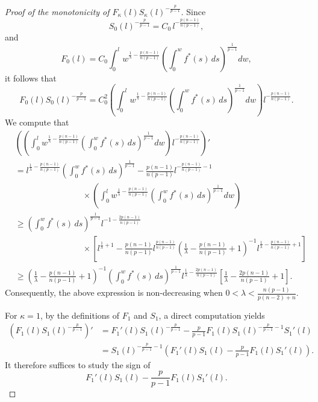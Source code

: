 \documentclass[11pt]{article}
\numberwithin{equation}{section}
\theoremstyle{definition}
\theoremstyle{remark}
\begin{document}
\begin{proof}[Proof of the monotonicity of $F_\kappa(l)S_\kappa(l)^{-\frac{p}{p-1}}$]
Since
\[
S_0(l)^{-\frac{p}{p-1}}
=
C_0\,l^{-\frac{p(n-1)}{n(p-1)}},
\]
and
\[
F_0(l)
=
C_0
\int_0^l
w^{\frac1\lambda-\frac{p(n-1)}{n(p-1)}}
\left(
\int_0^w f^*(s)\,ds
\right)^{\frac1{p-1}}
dw,
\]
it follows that
\[
F_0(l)S_0(l)^{-\frac{p}{p-1}}
=
C_0^2
\left(
\int_0^l
w^{\frac1\lambda-\frac{p(n-1)}{n(p-1)}}
\left(
\int_0^w f^*(s)\,ds
\right)^{\frac1{p-1}}
dw
\right)
l^{-\frac{p(n-1)}{n(p-1)}}.
\]
We compute that
\begin{align*}
&
\left(
\left(
\int_0^l w^{\frac{1}{\lambda}-\frac{p(n-1)}{n(p-1)}}
\left(\int_0^w f^*(s)\,ds\right)^\frac{1}{p-1}dw
\right)
l^{-\frac{p(n-1)}{n(p-1)}}
\right)' \\
&=l^{\frac{1}{\lambda}-\frac{p(n-1)}{n(p-1)}}\left(\int_0^w f^*(s)\,ds\right)^\frac{1}{p-1}
-\frac{p(n-1)}{n(p-1)}l^{-\frac{p(n-1)}{n(p-1)}-1}\\
&\qquad\qquad\qquad\qquad\times\left(
\int_0^l w^{\frac{1}{\lambda}-\frac{p(n-1)}{n(p-1)}}
\left(\int_0^w f^*(s)\,ds\right)^\frac{1}{p-1}dw
\right)\\
&\ge \left(\int_0^w f^*(s)\,ds\right)^\frac{1}{p-1} l^{-1-\frac{2p(n-1)}{n(p-1)}}
\\
&\qquad\qquad\qquad\qquad\times
\left[ l^{\frac{1}{\lambda}+1}- \frac{p(n-1)}{n(p-1)}l^{\frac{p(n-1)}{n(p-1)}}
(\frac{1}{\lambda}-\frac{p(n-1)}{n(p-1)}+1)^{-1}l^{\frac{1}{\lambda}-\frac{p(n-1)}{n(p-1)}+1}
                       \right]\\
&\ge (\frac{1}{\lambda}-\frac{p(n-1)}{n(p-1)}+1)^{-1}\left(\int_0^w f^*(s)\,ds\right)^\frac{1}{p-1} l^{\frac{1}{\lambda}-\frac{2p(n-1)}{n(p-1)}}\left[ \frac{1}{\lambda}-\frac{2p(n-1)}{n(p-1)} +1  \right]
.
\end{align*}
Consequently, the above expression is non-decreasing when
$
0 < \lambda < \frac{n(p-1)}{p(n-2)+n}.
$\par
For $\kappa=1$, by the definitions of $F_1$ and $S_1$, a direct computation yields
\begin{align*}
\left(F_1(l)S_1(l)^{-\frac{p}{p-1}}\right)'
&=
F_1'(l)S_1(l)^{-\frac{p}{p-1}}
-\frac{p}{p-1}
F_1(l)S_1(l)^{-\frac{p}{p-1}-1}S_1'(l)
\nonumber\\
&=
S_1(l)^{-\frac{p}{p-1}-1}
\left(
F_1'(l)S_1(l)
-\frac{p}{p-1}F_1(l)S_1'(l)
\right).
\end{align*}
\noindent
It therefore suffices to study the sign of
\[
F_1'(l)S_1(l)
-\frac{p}{p-1}F_1(l)S_1'(l).
\]
\noindent

\end{proof}
\end{document}
